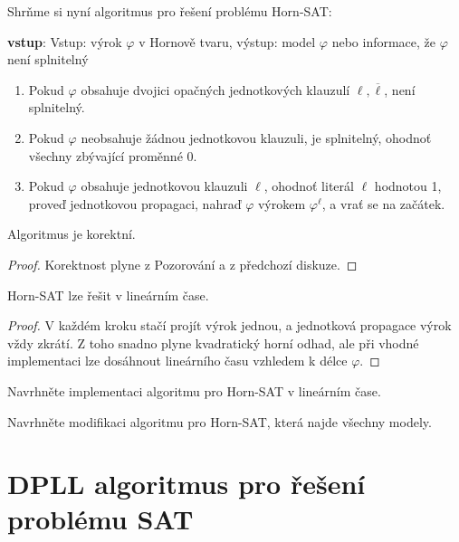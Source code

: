Shrňme si nyní algoritmus pro řešení problému Horn-SAT: 

\begin{algorithm}
\textbf{vstup}: Vstup: výrok $\varphi$ v Hornově tvaru, výstup: model $\varphi$ nebo informace, že  $\varphi$ není splnitelný
\begin{enumerate}
    \item Pokud $\varphi$ obsahuje dvojici opačných jednotkových klauzulí $\ell,\overline{\ell}$, není splnitelný.
    \item Pokud $\varphi$ neobsahuje žádnou jednotkovou klauzuli, je splnitelný, ohodnoť všechny zbývající proměnné 0.
    \item Pokud $\varphi$ obsahuje jednotkovou klauzuli $\ell$, ohodnoť literál $\ell$ hodnotou 1, proveď jednotkovou propagaci, nahraď $\varphi$ výrokem $\varphi^\ell$, a vrať se na začátek.
\end{enumerate}
\end{algorithm}

\begin{proposition}
Algoritmus je korektní.    
\end{proposition}
\begin{proof}
Korektnost plyne z Pozorování a z předchozí diskuze.
\end{proof}

\begin{corollary}
    Horn-SAT lze řešit v lineárním čase.
\end{corollary}

\begin{proof}
V každém kroku stačí projít výrok jednou, a jednotková propagace výrok vždy zkrátí. Z toho snadno plyne kvadratický horní odhad, ale při vhodné implementaci lze dosáhnout lineárního času vzhledem k délce $\varphi$.
\end{proof}


\begin{exercise}
Navrhněte implementaci algoritmu pro Horn-SAT v lineárním čase.
\end{exercise}

\begin{exercise}
Navrhněte modifikaci algoritmu pro Horn-SAT, která najde všechny modely.
\end{exercise}


\section{DPLL algoritmus pro řešení problému SAT}\label{section:DPLL}

